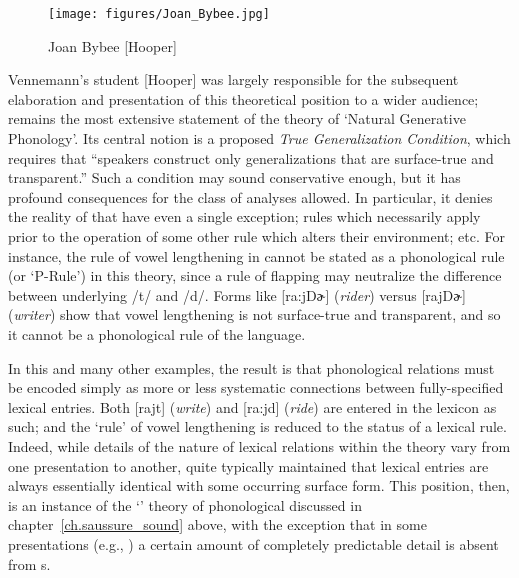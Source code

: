 \begin{wrapfigure}[13]{l}{.35\textwidth}
  \texttt{[image: figures/Joan\_Bybee.jpg]}
  \caption{Joan Bybee [Hooper]}
  \label{fig:ch.spe.bybee}
\end{wrapfigure}
Vennemann's student  [Hooper] was largely responsible for
the subsequent elaboration and presentation of this theoretical
position to a wider audience; \citealt{hooper:ngp} remains the most
extensive statement of the theory of `Natural Generative
Phonology'. Its central notion is a proposed \textit{True
  Generalization Condition}, which requires that ``speakers construct
only generalizations that are surface-true and transparent.'' Such a
condition may sound conservative enough, but it has profound
consequences for the class of analyses allowed. In particular, it
denies the reality of  that have even a single
exception; rules which necessarily apply prior to the operation of
some other rule which alters their environment; etc. For instance, the
rule of vowel lengthening in  cannot be stated as a
phonological rule (or `P-Rule') in this theory, since a rule of
flapping may neutralize the difference between underlying /t/ and
/d/. Forms like [ra:jDɚ] (\textit{rider}) versus [rajDɚ]
(\textit{writer}) show that vowel lengthening is not surface-true and
transparent, and so it cannot be a phonological rule of the language.

In this and many other examples, the result is that phonological
relations must be encoded simply as more or less systematic
connections between fully-specified lexical entries. Both [rajt]
(\textit{write}) and [ra:jd] (\textit{ride}) are entered in the
lexicon as such; and the `rule' of vowel lengthening is reduced to the
status of a lexical  rule. Indeed, while details of the
nature of lexical relations within the theory vary from one
presentation to another,  quite typically
maintained that lexical entries are always essentially identical with
some occurring surface form. This position, then, is an instance of
the `' theory of phonological
 discussed in chapter~\ref{ch.saussure_sound} above,
with the exception that in some presentations (e.g.,
\citealt{hooper75:archisegment}) a certain amount of completely
predictable detail is absent from s.


